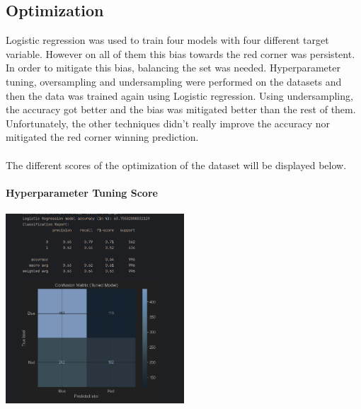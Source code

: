\documentclass{article}
\begin{document}
\subsection{Optimization}
Logistic regression was used to train four models with four different target variable. However on all of them this bias towards the red corner was persistent. In order to mitigate this bias, balancing the set was needed. Hyperparameter tuning, oversampling and undersampling were performed on the datasets and then the data was trained again using Logistic regression. Using undersampling, the accuracy got better and the bias was mitigated better than the rest of them. Unfortunately, the other techniques didn't really improve the accuracy nor mitigated the red corner winning prediction.\\\\
The different scores of the optimization of the dataset will be displayed below.\\\\
\newpage
	{\large \textbf{Hyperparameter Tuning Score}}\\\\
	\includegraphics[width=0.5\textwidth]{images/Hyperparameter_tuning_score.png}\\\\
\end{document}
